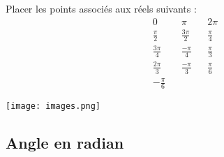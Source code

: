 \documentclass[11pt]{article}
\begin{document}
\begin{app}
  \begin{minipage}{.5\textwidth}
   Placer les points associés aux réels suivants : 
   \begin{align*}
     & 0 &
     & \pi &
     & 2\pi \\
     & \frac{\pi}{2} &
     & \frac{3\pi}{2} &
     & \frac{\pi}{4} \\
     & \frac{3\pi}{4} &
     & \frac{-\pi}{4} &
     & \frac{\pi}{3} \\
     & \frac{2\pi}{3} &
     & \frac{-\pi}{3} &
     & \frac{\pi}{6} \\
     &-\frac{\pi}{6}&
     & & &
   \end{align*}
  \end{minipage}
  \begin{minipage}{.5\textwidth}
    \begin{center}
      \texttt{[image: images.png]}
    \end{center}
  \end{minipage}
\end{app}

\subsection{Angle en radian}

\end{document}
